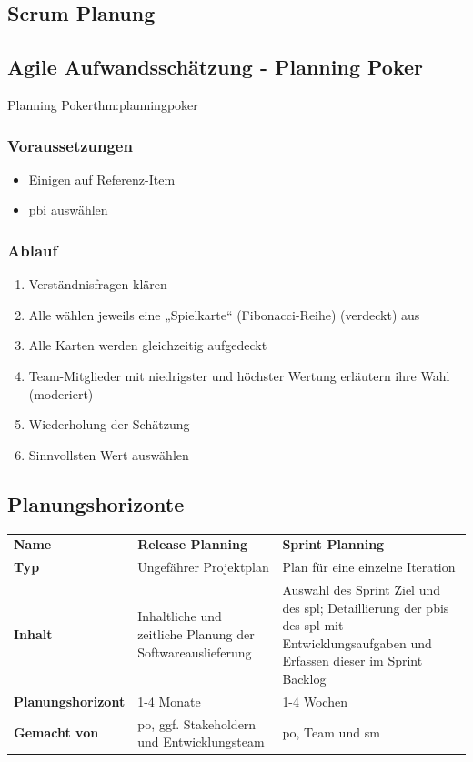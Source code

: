 \documentclass[main.tex]{subfiles}
\begin{document}
\subsection{Scrum Planung} \label{sec:scrumplanung}
\subsection*{Agile Aufwandsschätzung - Planning Poker} \label{sec:planningpoker}
\begin{myTheorem}{Planning Poker}{thm:planningpoker}

\end{myTheorem}
\subsubsection*{Voraussetzungen}
\begin{itemize}
    \item Einigen auf \gls{Referenz-Item}
    \item \gls{pbi} auswählen
\end{itemize}
\subsubsection*{Ablauf}
\begin{enumerate}
    \item Verständnisfragen klären
    \item Alle wählen jeweils eine „Spielkarte“ (Fibonacci-Reihe) (verdeckt) aus
    \item Alle Karten werden gleichzeitig aufgedeckt
    \item Team-Mitglieder mit niedrigster und höchster Wertung erläutern ihre Wahl (moderiert)
    \item Wiederholung der Schätzung
    \item Sinnvollsten Wert auswählen 
\end{enumerate}
\subsection*{Planungshorizonte} \label{sec:planungshorizonte}
\begin{table}[H]
    \centering
    \begin{tabular}{p{3cm} p{5.5cm} p{5.5cm}}
         \textbf{Name} & \textbf{Release Planning} & \textbf{Sprint Planning} \\ 
         \textbf{Typ} & Ungefährer Projektplan & Plan für eine einzelne Iteration \\
         \textbf{Inhalt} & Inhaltliche und zeitliche Planung der Softwareauslieferung & Auswahl des Sprint Ziel und des \gls{spl}; Detaillierung der \glspl{pbi} des \gls{spl} mit Entwicklungsaufgaben und Erfassen dieser im \gls{Sprint Backlog} \\
         \textbf{Planungshorizont} & 1-4 Monate & 1-4 Wochen \\
        \textbf{Gemacht von}  & \gls{po}, ggf. Stakeholdern und Entwicklungsteam  & \gls{po}, Team und \gls{sm}\\
    \end{tabular} 
\end{table}
\end{document}
